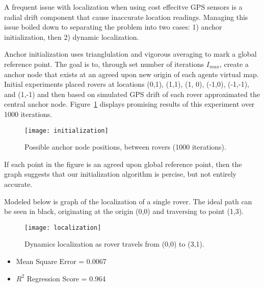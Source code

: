 A frequent issue with localization when using cost effecitve GPS sensors is a radial drift component that cause inaccurate location readings. Managing this issue boiled down to separating the problem into two cases: 1) anchor initialization, then 2) dynamic localization. 

Anchor initialization uses trianglulation and vigorous averaging to mark a global reference point. The goal is to, through set number of iterations $I_{max}$, create a anchor node that exists at an agreed upon new origin of each agents virtual map. Initial experiments placed rovers at locations (0,1), (1,1), (1, 0), (-1,0), (-1,-1), and (1,-1) and then based on simulated GPS drift of each rover approximated the central anchor node. Figure~\ref{fig:init} displays promising results of this experiment over 1000 iterations.

\begin{figure} 
	\centering
	\texttt{[image: initialization]}
	\caption{Possible anchor node positions, between rovers (1000 iterations).}
	\label{fig:init}
\end{figure}

If each point in the figure is an agreed upon global reference point, then the graph suggests that our initialization algorithm is percise, but not entirely accurate. 


Modeled below is graph of the localization of a single rover. The ideal path can be seen in black, originating at the origin (0,0) and traversing to point (1,3). 

\begin{figure} 
	\centering
	\texttt{[image: localization]}
	\caption{Dynamics localization as rover travels from (0,0) to (3,1).}
	\label{fig:dynamic}
\end{figure}


\begin{itemize}
	\item Mean Square Error = 0.0067 
	\item $R^2$ Regression Score = 0.964 
\end{itemize}
